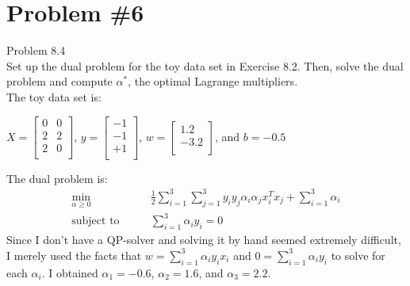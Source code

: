 \documentclass[12pt]{article}
\begin{document}
	\section*{Problem \#6}
	Problem 8.4 \\
	Set up the dual problem for the toy data set in Exercise 8.2. Then, solve the dual problem and compute $\alpha^*$, the optimal Lagrange
	multipliers. \\
	The toy data set is:
	\begin{center}
		$X = \left[
		\begin{array}{cc}
		0 & 0 \\
		2 &2 \\
		2 & 0 \\
		\end{array}
		\right]$, $y = \left[ 
		\begin{array}{c}
		-1\\
		-1\\
		+1\\
		\end{array} \right]$,
		$w = \left[ 
		\begin{array}{c}
		1.2\\
		-3.2\\
		\end{array} \right]$, and 
		$b=-0.5$
	\end{center}
	The dual problem is:
	\begin{align*}
		\underset{\alpha \ge 0}{\text{min}}\qquad &\frac{1}{2} \sum_{i=1}^{3}\sum_{j=1}^{3} y_i y_j \alpha_i \alpha_j x_i^T x_j + \sum_{i=1}^{3}\alpha_i\\
		\text{subject to} \qquad &\sum_{i=1}^{3} \alpha_iy_i = 0
	\end{align*}
	Since I don't have a QP-solver and solving it by hand seemed extremely difficult, I merely used the facts that $w = \sum_{i=1}^{3} \alpha_i y_i x_i$ and $0 = \sum_{i=1}^{3} \alpha_i y_i$ to solve for each $\alpha_i$. I obtained $\alpha_1 =-0.6$, $\alpha_2 =1.6$, and $\alpha_3 =2.2$.
	
\end{document}
